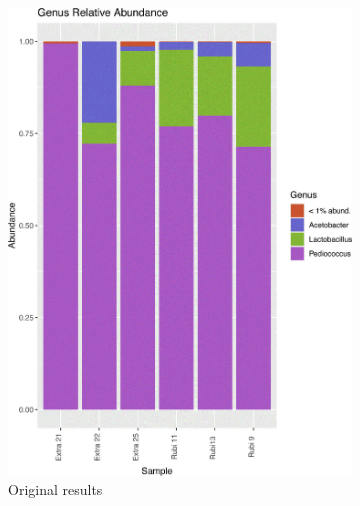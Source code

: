 \begin{figure}[H]
     \centering
     \begin{subfigure}[b]{0.45\textwidth}
         \centering
         \includegraphics[width=\textwidth]{images/original_doppel_baceteria_genus_relative_abundance.jpg}
        \caption{Original results}
     \end{subfigure}
     \hfill
     \begin{subfigure}[b]{0.45\textwidth}
         \centering

\end{subfigure}
\end{figure}
